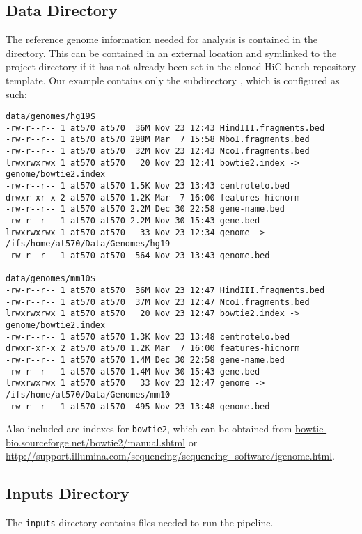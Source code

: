 \subsection{Data Directory}\label{Pipeline:data}
The reference genome information needed for analysis is contained in the  directory. This can be contained in an external location and symlinked to the project directory if it has not already been set in the cloned HiC-bench repository template. Our example  contains only the subdirectory , which is configured as such:

\begin{lstlisting}
data/genomes/hg19$
-rw-r--r-- 1 at570 at570  36M Nov 23 12:43 HindIII.fragments.bed
-rw-r--r-- 1 at570 at570 298M Mar  7 15:58 MboI.fragments.bed
-rw-r--r-- 1 at570 at570  32M Nov 23 12:43 NcoI.fragments.bed
lrwxrwxrwx 1 at570 at570   20 Nov 23 12:41 bowtie2.index -> genome/bowtie2.index
-rw-r--r-- 1 at570 at570 1.5K Nov 23 13:43 centrotelo.bed
drwxr-xr-x 2 at570 at570 1.2K Mar  7 16:00 features-hicnorm
-rw-r--r-- 1 at570 at570 2.2M Dec 30 22:58 gene-name.bed
-rw-r--r-- 1 at570 at570 2.2M Nov 30 15:43 gene.bed
lrwxrwxrwx 1 at570 at570   33 Nov 23 12:34 genome -> /ifs/home/at570/Data/Genomes/hg19
-rw-r--r-- 1 at570 at570  564 Nov 23 13:43 genome.bed

data/genomes/mm10$
-rw-r--r-- 1 at570 at570  36M Nov 23 12:47 HindIII.fragments.bed
-rw-r--r-- 1 at570 at570  37M Nov 23 12:47 NcoI.fragments.bed
lrwxrwxrwx 1 at570 at570   20 Nov 23 12:47 bowtie2.index -> genome/bowtie2.index
-rw-r--r-- 1 at570 at570 1.3K Nov 23 13:48 centrotelo.bed
drwxr-xr-x 2 at570 at570 1.2K Mar  7 16:00 features-hicnorm
-rw-r--r-- 1 at570 at570 1.4M Dec 30 22:58 gene-name.bed
-rw-r--r-- 1 at570 at570 1.4M Nov 30 15:43 gene.bed
lrwxrwxrwx 1 at570 at570   33 Nov 23 12:47 genome -> /ifs/home/at570/Data/Genomes/mm10
-rw-r--r-- 1 at570 at570  495 Nov 23 13:48 genome.bed
\end{lstlisting}

Also included are indexes for \texttt{bowtie2}, which can be obtained from \url{bowtie-bio.sourceforge.net/bowtie2/manual.shtml} or \url{http://support.illumina.com/sequencing/sequencing_software/igenome.html}.
\subsection{Inputs Directory}\label{Pipeline:inputs}
The \texttt{inputs} directory contains files needed to run the pipeline.

